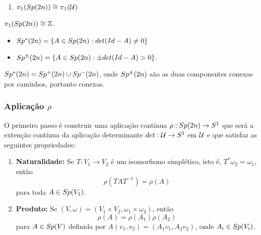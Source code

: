 \documentclass{beamer}
\begin{document}
\begin{footnotesize}
\begin{frame}
\begin{enumerate}
			\item $\pi_{1}(Sp(2n)) \cong \pi_{1}(\mathcal{U})$
			
		\end{enumerate}
		
		\begin{teorema}
			$\pi_{1}(Sp(2n)) \cong \mathbb{Z}$.
			
		\end{teorema}
		
		\begin{itemize}
			\item  $Sp^{*}(2n) = \{ A \in Sp(2n): det(Id-A)\neq 0 \}$
			\item $
			Sp^{\pm}(2n) = \{ A \in Sp(2n): \pm det(Id-A)> 0 \}. 
			$
		\end{itemize}
		
		\begin{lema}
			$Sp^{*}(2n) = Sp^{+}(2n)\cup Sp^{-}(2n)$, onde $Sp^{\pm}(2n)$ são as duas componentes conexas por caminhos, portanto conexas.
		\end{lema}
		
		
	\end{frame}
	
	\begin{frame}
		\frametitle{Aplicação $\rho$}
		
		O primeiro passo é construir uma aplicação contínua $\rho: Sp(2n)\to S^{1}$ que será a extenção contínua da aplicação determinante $det:\mathcal{U}\to S^{1}$ em $\mathcal{U}$ e que satisfaz as seguintes propriedades:
		
		\begin{scriptsize}
			\begin{enumerate}
				\item \textbf{Naturalidade:}  Se $T:V_{1} \to V_{2}$ é um isomorfismo simplético, isto é, $T^{*}\omega_{2} = \omega_{1}, $então 
				$$
				\rho(TAT^{-1}) = \rho(A)
				$$
				para toda $A\in Sp(V_{1})$.
				
				\item \textbf{Produto:} Se $(V,\omega) = (V_{1}\times V_{2},\omega_{1}\times \omega_{2})$, então
				$$
				\rho(A) = \rho(A_{1})\rho(A_{2})
				$$
				para $A\in Sp(V)$ definida por $A(v_{1}, v_{2})=(A_{1}v_{1}, A_{2}v_{2})$, onde $A_{i} \in Sp(V_{i})$.
			

\end{enumerate}
\end{scriptsize}
\end{frame}
\end{footnotesize}
\end{document}

